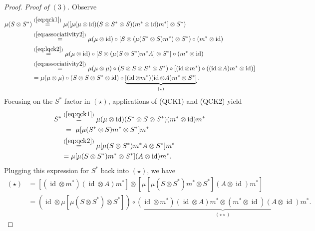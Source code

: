 \documentclass[11pt]{article}
\theoremstyle{plain}
\theoremstyle{nonumberplain}
\theoremstyle{plain}
\theoremstyle{nonumberplain}
\newtheorem{proof}{Proof.}
\DeclareMathOperator{\id}{id}
\newcommand\1{{\bf 1}}
\newcommand{\<}{\left\langle}
\renewcommand{\>}{\right\rangle}
\begin{document}
\begin{proof}
{\em Proof of $(3)$.} Observe
    \begin{align*}
    \mu  (S\otimes S^*)
    &\overset{(\ref{eq:qck1})}{=}
    \mu ([\mu  (\mu\otimes \id)   (S\otimes S^*\otimes S)   (m^*\otimes \id)  m^* ]\otimes S^*)\\   &\overset{(\ref{eq:associativity2})}{=}
    \mu (\mu\otimes \id) \circ  [S\otimes (\mu  (S^*\otimes S)  m^*) \otimes S^*) \circ (m^*\otimes \id)\\  
    &\overset{(\ref{eq:lqck2})}{=}
    \mu (\mu\otimes \id)  \circ [S\otimes (\mu  (S\otimes S^*)  m^*  A] \otimes S^*]\circ (m^*\otimes \id)\\   &\overset{(\ref{eq:associativity2})}{=}
    \mu (\mu\otimes \mu) \circ (S\otimes  S\otimes S^*\otimes S^*)  \circ [(\id\otimes m^*) \circ 
   ((\id\otimes A)  m^*\otimes \id)]\\
    &=
     \mu (\mu\otimes \mu) \circ (S\otimes  S\otimes S^*\otimes \id)  \circ \underbrace{[(\id\otimes m^*)(\id\otimes A)m^*\otimes S^*]}_{(\star)}.
    \end{align*}
Focusing on the $S^*$ factor in $(\star)$, applications of (QCK1) and (QCK2) yield
 \begin{align*}
     S^*
     &\overset{(\ref{eq:qck1})}{=}
      \mu   (\mu\otimes \id)   (S^*\otimes S \otimes S^*)  (m^*\otimes \id)  m^*\\
    &\,\,=
     \,\, \mu 
    [\mu  (S^*\otimes S)  m^* \otimes S^*] m^*\\
     &\overset{(\ref{eq:qck2})}{=}
 \mu  [\mu  (S\otimes S^*)  m^* A\otimes S^*] m^*\\
      &=
 \mu  [\mu  (S\otimes S^*)  m^* \otimes S^*] (A\otimes \id)m^*.
 \end{align*}
    Plugging this expression for $S^*$ back into $(\star)$, we have
    \begin{align*}
    (\star)
    &=
    [(\id\otimes m^*)(\id\otimes A)m^*] \otimes [\mu  [\mu  (S\otimes S^*)  m^* \otimes S^*] (A\otimes \id)m^*]\\
    &=
    (\id \otimes \mu  [\mu  (S\otimes S^*) \otimes S^*])
    \circ
    \underbrace{( \id\otimes m^*)(\id\otimes A)m^* \otimes (m^*\otimes \id)(A\otimes \id)m^*}_{(\star\star)}.
    \end{align*}


\end{proof}
\end{document}

